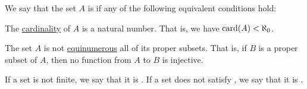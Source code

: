 \begin{definition}\label{def:set_finiteness}
  We say that the set \( A \) is  if any of the following equivalent conditions hold:
  \begin{thmenum}
     The \hyperref[thm:cardinality_existence]{cardinality} of \( A \) is a natural number. That is, we have \( \operatorname{card}(A) < \aleph_0 \).

    \medskip

     The set \( A \) is not \hyperref[def:equinumerosity]{equinumerous} all of its proper subsets. That is, if \( B \) is a proper subset of \( A \), then no function from \( A \) to \( B \) is injective.
  \end{thmenum}

  If a set is not finite, we say that it is . If a set does not satisfy , we say that it is .
\end{definition}
